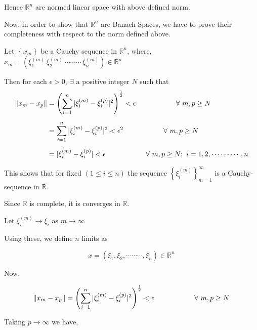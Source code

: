 \documentclass[a4paper,12pt]{article}
\begin{document}
    \vspace*{0.3cm}

    Hence $\mathbb{R}^n$ are  normed linear space with above defined norm.

    \pagebreak

    \vspace*{0.5cm}


    Now, in order to show that $\mathbb{R}^n$ are Banach Spaces, we have to prove their completeness with respect to the norm defined above.

    Let $\left\{x_m\right\}$ be a Cauchy sequence in $\mathbb{R}^n$, where,  $x_m = \left(\xi_1^{(m)}\ \xi_2^{(m)}\ \cdots \cdots \cdots\ \xi_n^{(m)}\right)\in \mathbb{R}^n$


    Then for each $\epsilon > 0,\ \exists$ a positive integer $N$ such that
    \begin{equation*}
        \begin{split}
            \norm{x_m -x_p} & = \left(\sum_{i=1}^{n}|\xi_i^{(m)} - \xi_i^{(p)}|^2\right)^\frac{1}{2} < \epsilon \hspace*{2cm} \forall\ m,p\geq N\\[2mm]
            & = \sum_{i=1}^{n} |\xi_i^{(m)} - \xi_i^{(p)}|^2 < \epsilon^2 \hspace*{2cm} \forall\ m,p\geq N \\[2mm]
            & = |\xi_i^{(m)} - \xi_i^{(p)}| < \epsilon \hspace*{2cm} \forall\ m,p \geq N ;\ i = 1,2,\cdots \cdots \cdots, n
        \end{split}
    \end{equation*}

    This shows that for fixed $(1\leq i \leq n)$ the sequence $\left\{\xi_i^{(m)}\right\}_{m=1}^{\infty}$ is a Cauchy-sequence in $\mathbb{R}$.

    Since $\mathbb{R}$ is complete, it is converges in $\mathbb{R}$.

    Let $\xi_i^{(m)}\to \xi_i$ as $m\to \infty$

    Using these, we define $n$ limits as

    \[x = \left(\xi_1,\xi_2, \cdots \cdots \cdots , \xi_n\right)\in \mathbb{R}^n\]

    Now,

    \[\norm{x_m -x_p}  = \left(\sum_{i=1}^{n}|\xi_i^{(m)} - \xi_i^{(p)}|^2\right)^\frac{1}{2} < \epsilon \hspace*{2cm} \forall\ m,p\geq N\]

    Taking $p\to \infty$ we have,
\end{document}
